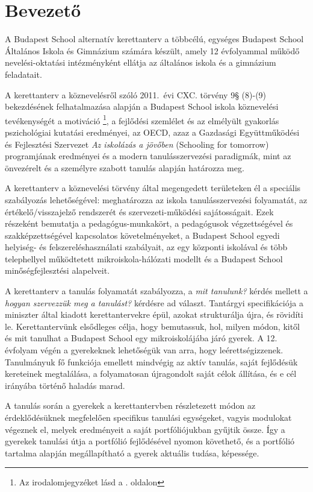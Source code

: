 \chapter{Bevezető}
A Budapest School alternatív kerettanterv a többcélú, egységes	Budapest School
Általános Iskola és Gimnázium számára készült, amely 12 évfolyammal működő
nevelési-oktatási intézményként ellátja az általános iskola és a gimnázium
feladatait.

A kerettanterv a köznevelésről szóló 2011.~évi CXC. törvény 9§ (8)-(9)
bekezdésének felhatalmazása alapján a Budapest School iskola köznevelési
tevékenységét a motiváció \citep{pink2011drive}\footnote{Az irodalomjegyzéket
    lásd a \pageref{sec:bibliographyk}. oldalon}, a fejlődési szemlélet
\citep{growthmindset} és az elmélyült gyakorlás \citep{ericsson2016peak}
pszichológiai kutatási eredményei, az  OECD, azaz a Gazdasági Együttműködési és
Fejlesztési Szervezet \emph{Az iskolázás a jövőben}  (Schooling for tomorrow)
programjának eredményei \citep{2006schooling}
és a modern tanulásszervezési paradigmák, mint az önvezérelt
\citep{mitra2012beyond} és a személyre szabott \citep{khan2012one} tanulás
alapján határozza meg.

A kerettanterv a köznevelési törvény által megengedett területeken él a
speciális szabályozás lehetőségével: meghatározza az iskola tanulásszervezési
folyamatát, az értékelő/visszajelző rendszerét és szervezeti-működési
sajátosságait. Ezek részeként bemutatja a pedagógus-munkakört, a pedagógusok
végzettségével és szakképzettségével kapcsolatos követelményeket, a Budapest
School	egyedi helyiség- és felszereléshasználati szabályait, az egy központi
iskolával és több telephellyel működtetett mikroiskola-hálózati modellt és a
Budapest School minőségfejlesztési alapelveit.

A kerettanterv	a tanulás folyamatát szabályozza, a \emph{mit tanulunk?} kérdés
mellett a \emph{hogyan szervezzük meg a tanulást?} kérdésre ad választ.
Tantárgyi specifikációja a miniszter által kiadott kerettantervekre
\citep{ofi:kerettanterv} épül, azokat strukturálja újra, és rövidíti le.
Kerettantervünk elsődleges célja, hogy bemutassuk, hol, milyen módon, kitől és
mit tanulhat a Budapest School egy mikroiskolájába járó gyerek. A 12. évfolyam
végén a gyerekeknek lehetőségük van arra, hogy leérettségizzenek. Tanulmányuk
fő funkciója emellett mindvégig az aktív tanulás, saját fejlődésük kereteinek
megtalálása, a folyamatosan újragondolt saját célok állítása, és e cél
irányába történő haladás marad.

A tanulás során a gyerekek a kerettantervben részletezett módon az
érdeklődésüknek megfelelően specifikus tanulási egységeket, vagyis modulokat
végeznek el, melyek eredményeit a saját portfóliójukban gyűjtik össze. Így a
gyerekek tanulási útja a portfólió fejlődésével nyomon követhető, és a
portfólió tartalma alapján megállapítható a gyerek aktuális tudása, képessége.

